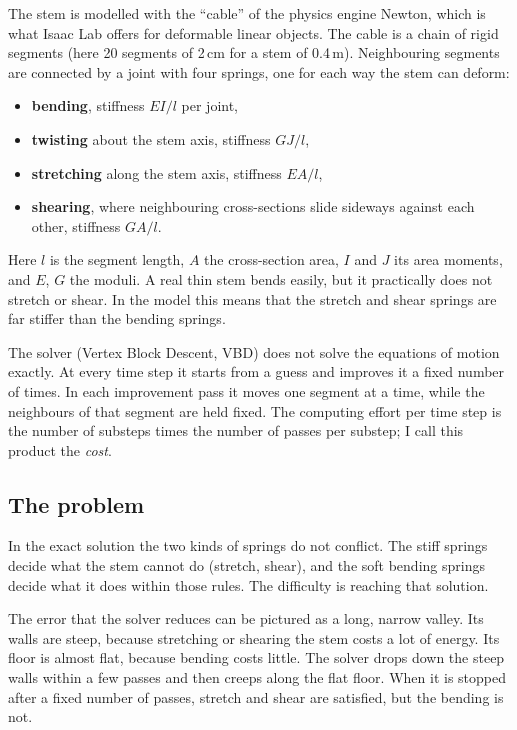 The stem is modelled with the ``cable'' of the physics engine Newton, which is what Isaac Lab offers for
deformable linear objects. The cable is a chain of rigid segments (here 20 segments of 2\,cm for a stem of
0.4\,m). Neighbouring segments are connected by a joint with four springs, one for each way the stem can
deform:
\begin{itemize}
  \item \textbf{bending}, stiffness $EI/l$ per joint,
  \item \textbf{twisting} about the stem axis, stiffness $GJ/l$,
  \item \textbf{stretching} along the stem axis, stiffness $EA/l$,
  \item \textbf{shearing}, where neighbouring cross-sections slide sideways against each other, stiffness
        $GA/l$.
\end{itemize}
Here $l$ is the segment length, $A$ the cross-section area, $I$ and $J$ its area moments, and $E$, $G$ the
moduli. A real thin stem bends easily, but it practically does not stretch or shear. In the model this
means that the stretch and shear springs are far stiffer than the bending springs.

The solver (Vertex Block Descent, VBD) does not solve the equations of motion exactly. At every time step
it starts from a guess and improves it a fixed number of times. In each improvement pass it moves one
segment at a time, while the neighbours of that segment are held fixed. The computing effort per time step
is the number of substeps times the number of passes per substep; I call this product the \emph{cost}.

\subsection{The problem}

In the exact solution the two kinds of springs do not conflict. The stiff springs decide what the stem
cannot do (stretch, shear), and the soft bending springs decide what it does within those rules. The
difficulty is reaching that solution.

The error that the solver reduces can be pictured as a long, narrow valley. Its walls are steep, because
stretching or shearing the stem costs a lot of energy. Its floor is almost flat, because bending costs
little. The solver drops down the steep walls within a few passes and then creeps along the flat floor.
When it is stopped after a fixed number of passes, stretch and shear are satisfied, but the bending is
not.

